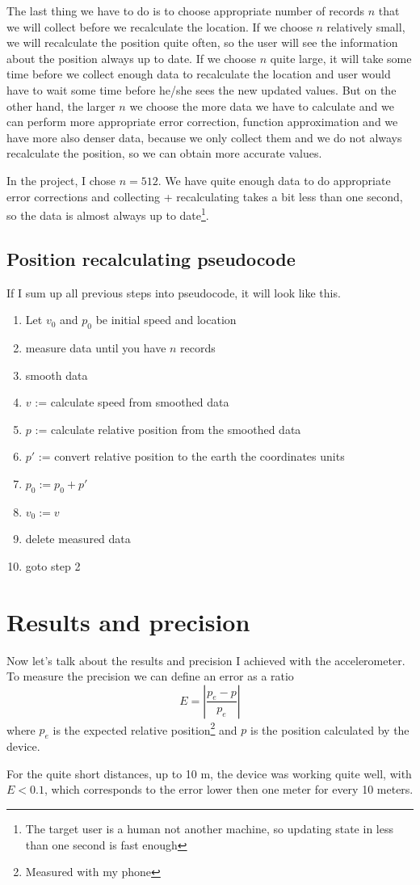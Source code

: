 \documentclass[hidelinks,a4paper]{article}
\begin{document}
The last thing we have to do is to choose appropriate number of records $n$ that we will collect before we recalculate the location. If we choose $n$ relatively small, we will recalculate the position quite often, so the user will see the information about the position always up to date. If we choose $n$ quite large, it will take some time before we collect enough data to recalculate the location and user would have to wait some time before he/she sees the new updated values. But on the other hand, the larger $n$ we choose the more data we have to calculate and we can perform more appropriate error correction, function approximation and we have more also denser data, because we only collect them and we do not always recalculate the position, so we can obtain more accurate values.\par
In the project, I chose $n = 512$. We have quite enough data to do appropriate error corrections and collecting + recalculating takes a bit less than one second, so the data is almost always up to date\footnote{The target user is a human not another machine, so updating state in less than one second is fast enough}.

\subsection{Position recalculating pseudocode}
If I sum up all previous steps into pseudocode, it will look like this.
\begin{enumerate}
    \item Let $v_0$ and $p_0$ be initial speed and location
    \item measure data until you have $n$ records
    \item smooth data
    \item $v$ := calculate speed from smoothed data
    \item $p$ := calculate relative position from the smoothed data
    \item $p'$ := convert relative position to the earth the coordinates units
    \item $p_0 := p_0 + p'$
    \item $v_0 := v$
    \item delete measured data
    \item goto step 2
\end{enumerate}


\section{Results and precision}
Now let's talk about the results and precision I achieved with the accelerometer. To measure the precision we can define an error as a ratio
$$
    E = \left|\frac{p_e - p}{p_e}\right|
$$
where $p_e$ is the expected relative position\footnote{Measured with my phone} and $p$ is the position calculated by the device.\par
For the quite short distances, up to 10 m, the device was working quite well, with $E < 0.1$, which corresponds to the error lower then one meter for every 10 meters.
\end{document}
